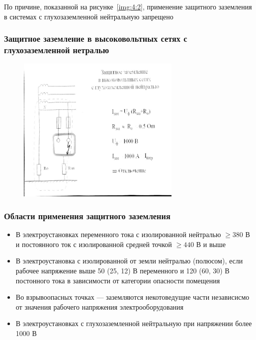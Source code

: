 \documentclass[a4paper, 14pt]{extarticle}
\begin{document}
По причине, показанной на рисунке~\ref{img:4:2}, применение защитного заземления в системах с глухозаземленной нейтральную запрещено

\subsubsection*{Защитное заземление в высоковольтных сетях с глухозаземленной нетралью}

\begin{figure}[h]
    \centering
    \includegraphics[width=0.7\textwidth]{./img/L4/S003.jpg}
\end{figure}


\subsubsection*{Области применения защитного заземления}
\begin{itemize}
    \item В электроустановках переменного тока с изолированной нейтралью $ \ge 380 $ В и постоянного ток с изолированной средней точкой $ \ge 440 $ В и выше
    \item В электроустановка с изолированной от земли нейтралью (полюсом), если рабочее напряжение выше 50 (25, 12) В переменного и 120 (60, 30) В постонного тока в зависимости от категории опасности помещения
    \item Во взрывоопасных точках --- заземляются некотоведущие части независисмо от значения рабочего напряжения электрооборудования
    \item В электроустановках с глухозаземленной нейтральную при напряжении более 1000 В
\end{itemize}
\end{document}
